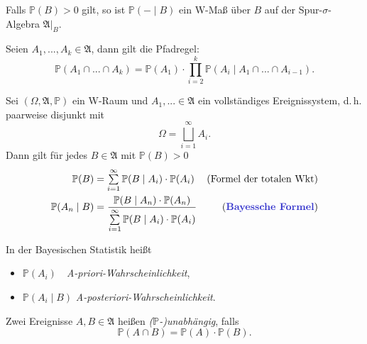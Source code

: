 \documentclass{cheat-sheet}
\newcommand{\Alg}{\mathfrak{A}} %
\renewcommand{\P}{\mathbb{P}} %
\begin{document}
\begin{bem}
  Falls $\P(B) > 0$ gilt, so ist $\P(- \mid B)$ ein W-Maß über $B$ auf der Spur-$\sigma$-Algebra $\Alg|_B$.
\end{bem}

\begin{lem}
  Seien $A_1, ..., A_k \in \Alg$, dann gilt die Pfadregel:
  \[ \P(A_1 \cap ... \cap A_k) = \P(A_1) \cdot \prod_{i=2}^k \P(A_i \mid A_1 \cap ... \cap A_{i-1}). \]
\end{lem}





\begin{satz}
  Sei $(\Omega, \Alg, \P)$ ein W-Raum und $A_1, ... \in \Alg$ ein vollständiges Ereignissystem, d.\,h. paarweise disjunkt mit
  \[ \Omega = \bigsqcup_{i = 1}^\infty A_i. \]
  Dann gilt für jedes $B \in \Alg$ mit $\P(B) > 0$
  \begin{align*}
    \P(B) &= \sum_{i=1}^{\infty} \P(B \mid A_i) \cdot \P(A_i) & \text{(Formel der totalen Wkt)} \\
    \P(A_n \mid B) &= \frac{\P(B \mid A_n) \cdot \P(A_n)}{\sum_{i=1}^\infty \P(B \mid A_i) \cdot \P(A_i)} & \text{(\emph{Bayessche Formel})}
  \end{align*}
\end{satz}


\begin{sprech}
  In der Bayesischen Statistik heißt
  \begin{itemize}
    \item $\P(A_i)$ \quad \,\, \emph{A-priori-Wahrscheinlichkeit},
    \item $\P(A_i \mid B)$ \emph{A-posteriori-Wahrscheinlichkeit}.
  \end{itemize}
\end{sprech}



\begin{defn}
  Zwei Ereignisse $A, B \in \Alg$ heißen \emph{($\P$-)unabhängig}, falls
  \[ \P(A \cap B) = \P(A) \cdot \P(B). \]
\end{defn}
\end{document}
